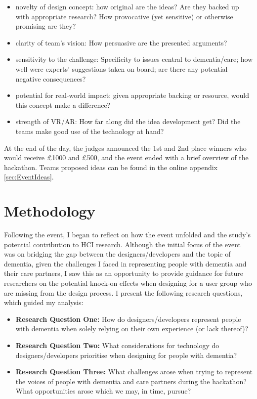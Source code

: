 \begin{itemize}
\item novelty of design concept: how original are the ideas? Are they backed up with appropriate research? How provocative (yet sensitive) or otherwise promising are they?
\item clarity of team's vision: How persuasive are the presented arguments?
\item sensitivity to the challenge: Specificity to issues central to dementia/care; how well were experts’ suggestions taken on board; are there any potential negative consequences?
\item potential for real-world impact: given appropriate backing or resource, would this concept make a difference?
\item strength of VR/AR: How far along did the idea development get? Did the teams make good use of the technology at hand? 
\end{itemize}

At the end of the day, the judges announced the 1st and 2nd place winners who would receive £1000 and £500, and the event ended with a brief overview of the hackathon. Teams proposed ideas can be found in the online appendix \ref{sec:EventIdeas}.

\section{Methodology}
\label{sec:methodology}
Following the event, I began to reflect on how the event unfolded and the study's potential contribution to HCI research. Although the initial focus of the event was on bridging the gap between the designers/developers and the topic of dementia, given the challenges I faced in representing people with dementia and their care partners, I saw this as an opportunity to provide guidance for future researchers on the potential knock-on effects when designing for a user group who are missing from the design process. I present the following research questions, which guided my analysis:

\begin{itemize}
    \item \textbf{Research Question One:} How do designers/developers represent people with dementia when solely relying on their own experience (or lack thereof)? 

    \item \textbf{Research Question Two:} What considerations for technology do designers/developers prioritise when designing for people with dementia?

    \item \textbf{Research Question Three:}  What challenges arose when trying to represent the voices of people with dementia and care partners during the hackathon? What opportunities arose which we may, in time, pursue?

\end{itemize}

